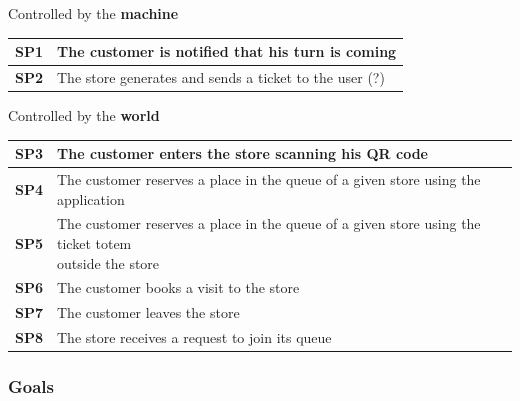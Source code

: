 \documentclass[]{article}
\begin{document}
			Controlled by the \textbf{machine}\newline\newline
					\begin{tabular}{|c|l|}
						\hline
						\rowcolor[HTML]{DCDCDC} 
						\textbf{SP1} & The customer is notified that his turn is coming \\ \hline
						\textbf{SP2} & The store generates and sends a ticket to the user (?) \\ \hline
					\end{tabular} \newline\newline\newline
			Controlled by the \textbf{world}\newline\newline
					\begin{tabular}{|c|l|}
						\hline
						\rowcolor[HTML]{DCDCDC} 
						\textbf{SP3} & The customer enters the store scanning his QR code \\ \hline
						\textbf{SP4} & The customer reserves a place in the queue of a given store using the application \\ \hline
						\rowcolor[HTML]{DCDCDC} 
						\textbf{SP5} & \makecell[l]{The customer reserves a place in the queue of a given store using the ticket totem \\outside the store}\\ \hline
						\textbf{SP6} & The customer books a visit to the store \\ \hline
						\rowcolor[HTML]{DCDCDC} 
						\textbf{SP7} & The customer leaves the store \\ \hline
						\textbf{SP8} & The store receives a request to join its queue \\ \hline
					\end{tabular}
					
		
		\subsubsection{Goals}
		
\end{document}
